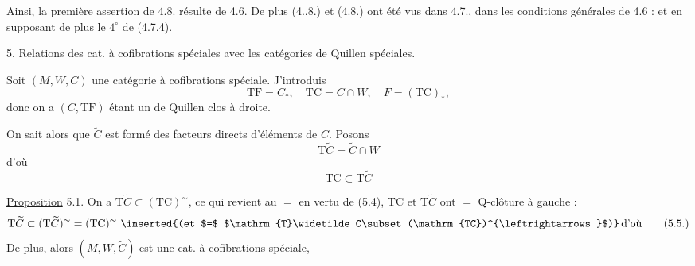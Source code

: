 Ainsi, la  première assertion de 4.8. résulte de 4.6. De plus (4..8.) et (4.8.) ont été vus dans 4.7., dans les conditions générales de 4.6 : et en supposant de plus le $4^\circ$ de (4.7.4)\unsure{)|{}}.

5. Relations des cat. à cofibrations spéciales avec les  catégories de Quillen spéciales.

Soit $(M,W,C)$ une catégorie à cofibrations spéciale. J'introduis
\[
\mathrm{TF}=C_*,\quad \mathrm{TC}=C\cap W,\quad F=(\mathrm{TC})_*,\tag*{(5.1)}
\]
donc on a
$(C,\mathrm{TF})$ étant un  de Quillen clos à droite.

 On sait alors  que $\widetilde C$ est formé des facteurs directs d'éléments de $C$. Posons
\[
\mathrm{T}\widetilde C=\widetilde C\cap W\tag*{(5.3)}
\]
d'où
\[
\mathrm{TC}\subset\mathrm{T}\widetilde C\tag*{(5.4)}
\]

\uline{Proposition} 5.1.  On a $\mathrm{T}\widetilde C\subset(\mathrm{TC})^{\sim}$,  ce qui revient au $=$ en vertu de (5.4),  $\mathrm{TC}$ et $\mathrm{T}\widetilde C$ ont $=$ Q-clôture à gauche : 
\[
\mathrm{T}\widetilde C\subset(\mathrm{T}\widetilde C)^{\sim}=(\mathrm{TC})^{\sim}\ \text{\inserted{(et $=$ $\mathrm{T}\widetilde C\subset(\mathrm{TC})^{\leftrightarrows}$)}}\,\text{d'où}\tag*{(5.5.)}
\]
\inserted{
\[
\boxed{(\widetilde C)_*=C_*(=\mathrm{TF}),\quad(\mathrm{T}\widetilde C)_*=(\mathrm{TC})_*\ (=F).}\tag*{(5.6)}
\]
}
De plus,    alors $(M,W,\widetilde C)$  est une cat. à cofibrations spéciale,

